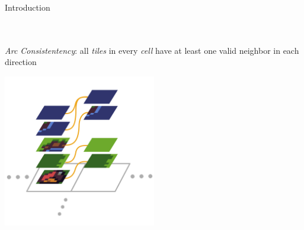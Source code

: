 \documentclass{beamer}
\begin{document}
  \begin{frame}[fragile]{Introduction}

    \hfill \\
    \hfill \\

    \textit{Arc Consistentency}: all \textit{tiles} in every \textit{cell} have at least
    one valid neighbor in each direction
    \begin{center}
      \includegraphics[width=0.5\textwidth]{figs/ac_illustration_consistent.pdf}
    \end{center}

  \end{frame}
\end{document}
